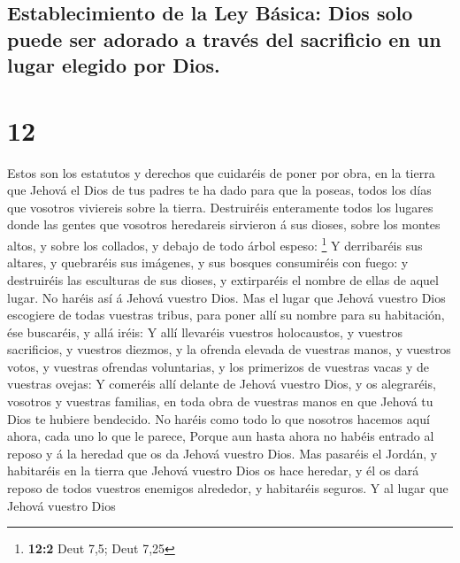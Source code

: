 \hypertarget{establecimiento-de-la-ley-buxe1sica-dios-solo-puede-ser-adorado-a-travuxe9s-del-sacrificio-en-un-lugar-elegido-por-dios.}{%
\subsection{Establecimiento de la Ley Básica: Dios solo puede ser
adorado a través del sacrificio en un lugar elegido por
Dios.}\label{establecimiento-de-la-ley-buxe1sica-dios-solo-puede-ser-adorado-a-travuxe9s-del-sacrificio-en-un-lugar-elegido-por-dios.}}

\hypertarget{section-11}{%
\section{12}\label{section-11}}

 Estos son los estatutos y derechos que cuidaréis de poner
por obra, en la tierra que Jehová el Dios de tus padres te ha dado para
que la poseas, todos los días que vosotros viviereis sobre la tierra.
 Destruiréis enteramente todos los lugares donde las
gentes que vosotros heredareis sirvieron á sus dioses, sobre los montes
altos, y sobre los collados, y debajo de todo árbol espeso: \footnote{\textbf{12:2}
  Deut 7,5; Deut 7,25}  Y derribaréis sus altares, y
quebraréis sus imágenes, y sus bosques consumiréis con fuego: y
destruiréis las esculturas de sus dioses, y extirparéis el nombre de
ellas de aquel lugar.  No haréis así á Jehová vuestro
Dios.  Mas el lugar que Jehová vuestro Dios escogiere de
todas vuestras tribus, para poner allí su nombre para su habitación, ése
buscaréis, y allá iréis:  Y allí llevaréis vuestros
holocaustos, y vuestros sacrificios, y vuestros diezmos, y la ofrenda
elevada de vuestras manos, y vuestros votos, y vuestras ofrendas
voluntarias, y los primerizos de vuestras vacas y de vuestras ovejas:
 Y comeréis allí delante de Jehová vuestro Dios, y os
alegraréis, vosotros y vuestras familias, en toda obra de vuestras manos
en que Jehová tu Dios te hubiere bendecido.  No haréis
como todo lo que nosotros hacemos aquí ahora, cada uno lo que le parece,
 Porque aun hasta ahora no habéis entrado al reposo y á la
heredad que os da Jehová vuestro Dios.  Mas pasaréis el
Jordán, y habitaréis en la tierra que Jehová vuestro Dios os hace
heredar, y él os dará reposo de todos vuestros enemigos alrededor, y
habitaréis seguros.  Y al lugar que Jehová vuestro Dios
